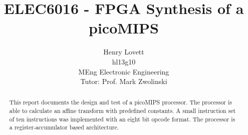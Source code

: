 \documentclass[12pt]{article}
\author{Henry Lovett \\ hl13g10 \\ MEng Electronic Engineering \\ Tutor: Prof. Mark Zwolinski}
\title{ELEC6016 - FPGA Synthesis of a picoMIPS}
\begin{document}
\maketitle
\listoftodos
\begin{abstract}
This report documents the design and test of a picoMIPS processor.
The processor is able to calculate an affine transform with predefined constants. 
A small instruction set of ten instructions was implemented with an eight bit opcode format. 
The processor is a register-accumulator based architecture. 
\end{abstract}



\end{document}
